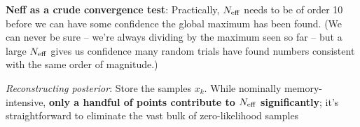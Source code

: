 \documentclass[twocolumn,prd,nofootinbib]{revtex4}
\begin{document}
\begin{shaded}
\noindent \textbf{Neff as  a crude convergence test}: Practically, $N_{\rm eff}$ needs to be of order 10 before we can have some confidence the global maximum has been
found.  (We can never be sure -- we're always dividing by the maximum seen so far -- but a large $N_{\rm eff}$ gives us
confidence many random trials have found numbers consistent with the same order of magnitude.)
\end{shaded}

\noindent \emph{Reconstructing posterior}: Store the samples $x_k$.  While nominally memory-intensive, \textbf{only a handful of
  points contribute to $N_{\rm eff}$ significantly}; it's straightforward to eliminate the vast bulk of zero-likelihood samples
\end{document}

